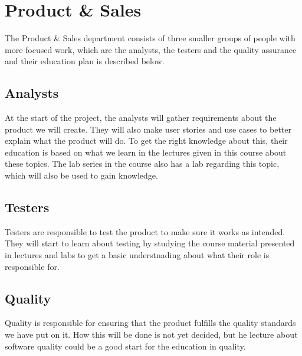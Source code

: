 \section{Product \& Sales}
\label{sec:pands}

The Product \& Sales department consists of three smaller groups of people with more focused work, which are the analysts, the testers and the quality assurance and their education plan is described below.

\subsection{Analysts}
At the start of the project, the analysts will gather requirements about the product we will create. They will also make user stories and use cases to better explain what the product will do. To get the right knowledge about this, their education is based on what we learn in the lectures given in this course about these topics. The lab series in the course also has a lab regarding this topic, which will also be used to gain knowledge.


\subsection{Testers}
Testers are responsible to test the product to make sure it works as intended. They will start to learn about testing by studying the course material presented in lectures and labs to get a basic understnading about what their role is responsible for.


\subsection{Quality}
Quality is responsible for ensuring that the product fulfills the quality standards we have put on it. How this will be done is not yet decided, but he lecture about software quality could be a good start for the education in quality. 

